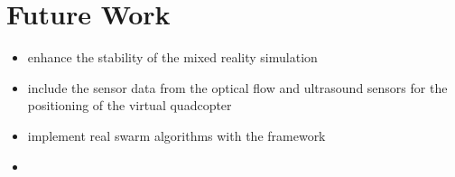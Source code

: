 \section{Future Work}
\begin{itemize}
\item{enhance the stability of the mixed reality simulation}
\item{include the sensor data from the optical flow and ultrasound sensors for the positioning of the virtual quadcopter}
\item{implement real swarm algorithms with the framework}
\item{}
\end{itemize}




      


